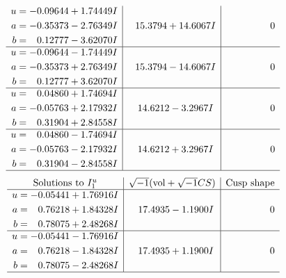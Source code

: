 \documentclass[1p]{elsarticle_modified}
\theoremstyle{definition}
\newcommand{\I}{\sqrt{-1}}
\begin{document}
$$\begin{array}{c|c|c}
\begin{aligned}
u &= -0.09644 + 1.74449 I \\
a &= -0.35373 - 2.76349 I \\
b &= \phantom{-}0.12777 - 3.62070 I\end{aligned}
 & \phantom{-}15.3794 + 14.6067 I & \phantom{-0.000000 } 0 \\ \hline\begin{aligned}
u &= -0.09644 - 1.74449 I \\
a &= -0.35373 + 2.76349 I \\
b &= \phantom{-}0.12777 + 3.62070 I\end{aligned}
 & \phantom{-}15.3794 - 14.6067 I & \phantom{-0.000000 } 0 \\ \hline\begin{aligned}
u &= \phantom{-}0.04860 + 1.74694 I \\
a &= -0.05763 + 2.17932 I \\
b &= \phantom{-}0.31904 + 2.84558 I\end{aligned}
 & \phantom{-}14.6212 - 3.2967 I & \phantom{-0.000000 } 0 \\ \hline\begin{aligned}
u &= \phantom{-}0.04860 - 1.74694 I \\
a &= -0.05763 - 2.17932 I \\
b &= \phantom{-}0.31904 - 2.84558 I\end{aligned}
 & \phantom{-}14.6212 + 3.2967 I & \phantom{-0.000000 } 0\\
 \hline 
 \end{array}$$\newpage$$\begin{array}{c|c|c}  
\text{Solutions to }I^u_{1}& \I (\text{vol} + \sqrt{-1}CS) & \text{Cusp shape}\\
 \hline 
\begin{aligned}
u &= -0.05441 + 1.76916 I \\
a &= \phantom{-}0.76218 + 1.84328 I \\
b &= \phantom{-}0.78075 + 2.48268 I\end{aligned}
 & \phantom{-}17.4935 - 1.1900 I & \phantom{-0.000000 } 0 \\ \hline\begin{aligned}
u &= -0.05441 - 1.76916 I \\
a &= \phantom{-}0.76218 - 1.84328 I \\
b &= \phantom{-}0.78075 - 2.48268 I\end{aligned}
 & \phantom{-}17.4935 + 1.1900 I & \phantom{-0.000000 } 0\\
 \hline 
 \end{array}$$\newpage\newpage\renewcommand{\arraystretch}{1}
\end{document}
